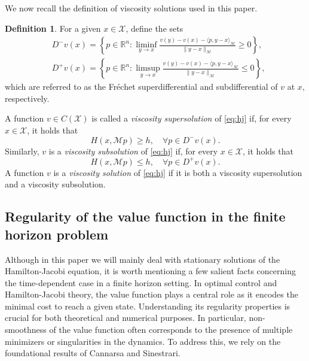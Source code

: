 \documentclass[a4paper,10pt]{amsart}
\theoremstyle{plain}
\theoremstyle{definition}
\newtheorem{defn}[thm]{Definition}
\numberwithin{equation}{section}
\numberwithin{thm}{section}
\begin{document}
We now recall the definition of viscosity solutions used in this paper.

\begin{defn}\label{def:viscosity}
     For a given $x\in\mathcal{X}$, define the sets
    \begin{displaymath}\begin{split}
        &D^- v(x) = \left\{ p \in \mathbb{R}^n : \liminf_{y\rightarrow x}\frac{v(y)-v(x) - \langle p, y-x \rangle_\mathcal{M}}{\|y-x\|_\mathcal{M}} \geq 0 \right\},\\
        &D^+ v(x) = \left\{ p \in \mathbb{R}^n : \limsup_{y\rightarrow x}\frac{v(y)-v(x) - \langle p, y-x \rangle_\mathcal{M}}{\|y-x\|_\mathcal{M}} \leq 0 \right\},
    \end{split}\end{displaymath}
    which are referred to as the Fréchet superdifferential and subdifferential of $v$ at $x$, respectively.

    A function $v \in C(\mathcal{X})$ is called a \emph{viscosity supersolution} of \eqref{eq:hj} if, for every $x \in \mathcal{X}$, it holds that
    \[
    H(x, \mathcal M p) \geq h, \quad \forall p \in D^- v(x).
    \]
    Similarly, $v$ is a \emph{viscosity subsolution} of \eqref{eq:hj} if, for every $x \in \mathcal{X}$, it holds that
    \[
    H(x, \mathcal M p) \leq h, \quad \forall p \in D^+ v(x).
    \]
    A function $v$ is a \emph{viscosity solution} of \eqref{eq:hj} if it is both a viscosity supersolution and a viscosity subsolution.
\end{defn}



\subsection{Regularity of the value function in the finite horizon problem}
Although in this paper we will mainly deal with stationary solutions of the Hamilton-Jacobi equation, it is worth mentioning a few salient facts concerning the time-dependent case in a finite horizon setting. In optimal control and Hamilton-Jacobi theory, the value function plays a central role as it encodes the minimal cost to reach a given state. Understanding its regularity properties is crucial for both theoretical and numerical purposes. In particular, non-smoothness of the value function often corresponds to the presence of multiple minimizers or singularities in the dynamics. To address this, we rely on the foundational results of Cannarsa and Sinestrari.
\end{document}
